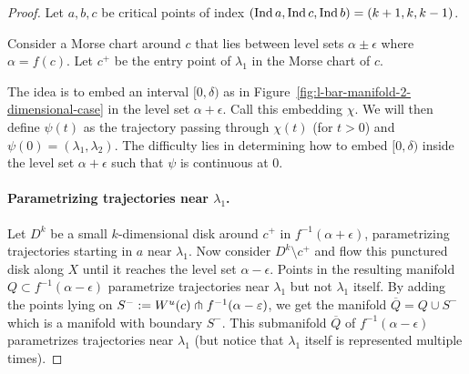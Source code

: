 \begin{proof}
    Let $a,b,c$ be critical points of index $(\operatorname{Ind} a, \operatorname{Ind} c, \operatorname{Ind} b) = (k+1,k,k-1)$.
    \begin{marginfigure}
        \centering
        \caption{The map $\chi$ is an embedding of a half-open interval $[0, \delta)$ in the level set $\alpha+ \epsilon$. Considering the trajectories passing through these points, we get an embdding $\psi: [0, \delta) \to \Lb ab$.}
        \label{fig:l-bar-manifold-2-dimensional-case}
    \end{marginfigure}
    Consider a Morse chart around $c$ that lies between level sets $\alpha \pm \epsilon$ where  $\alpha = f(c)$.
    Let $c^{+}$ be the entry point of $\lambda_1$ in  the Morse chart of $c$.

    The idea is to embed an interval $[0, \delta)$ as in Figure~\ref{fig:l-bar-manifold-2-dimensional-case} in the level set $\alpha + \epsilon$. Call this embedding $\chi$.
    We will then define $\psi(t)$ as the trajectory passing through $\chi(t)$ (for $t>0$) and  $\psi(0) = (\lambda_1, \lambda_2)$.
    The difficulty lies in determining how to embed $[0, \delta)$ inside the level set $\alpha + \epsilon$ such that $\psi$ is continuous at  $0$.
    \begin{marginfigure}
        \centering
        \caption{An overview of the different submanifolds considered in the proof.}
        \label{fig:l-bar-manifold-2-dimensional-case-part-flow}
    \end{marginfigure}
\begin{marginfigure}
    \centering
    \caption{The situation in three dimensions.}
    \label{fig:lbar-manifold-three-dimensional-case}
\end{marginfigure}

\paragraph{Parametrizing trajectories near $\lambda_1$.}
Let $D^{k}$ be a small $k$-dimensional disk around $c^{+}$ in $f^{-1}(\alpha+\epsilon)$, parametrizing trajectories starting in $a$ near $\lambda_1$.
    Now consider $D^{k} \setminus c^{+}$ and flow this punctured disk along $X$ until it reaches the level set  $\alpha - \epsilon$.
    Points in the resulting manifold $Q \subset f^{-1}(\alpha - \epsilon)$ parametrize trajectories near $\lambda_1$ but not $\lambda_1$ itself.
    By adding the points lying on $S^{-} := W^u(c) \pitchfork f^{-1}(\alpha - \varepsilon)$, we get the manifold $\overline{Q} = Q \cup S^{-}$ which is a manifold with boundary $S^{-}$.
    This submanifold $\overline{Q}$ of $f^{-1}(\alpha-\epsilon)$ parametrizes trajectories near $\lambda_1$ (but notice that $\lambda_1$ itself is represented multiple times).



\end{proof}

